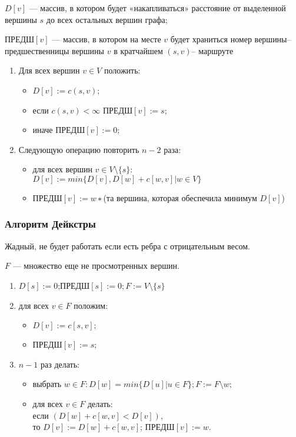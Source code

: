 $D[v]$ — массив, в котором будет «накапливаться» расстояние от выделенной вершины $s$ до всех остальных вершин графа;

 ПРЕДШ$[v]$ — массив, в котором на месте $v$ будет храниться номер вершины–предшественницы вершины $v$ в кратчайшем $(s,v)$– маршруте
 
\begin{enumerate}
	\item Для всех вершин $v \in V$ положить: \begin{itemize}
		\item $D[v] := c(s, v)$;
		\item если $ c(s,v) < \infty$ ПРЕДШ$[v] := s$;
		\item иначе ПРЕДШ$[v] := 0$;
	\end{itemize}
	\item Следующую операцию повторить $n − 2$ раза: \begin{itemize}
		\item для всех вершин $v \in V \setminus \{s\}$:\\ $D[v]:=min\{D[v],D[w]+c[w,v]|w \in V\}$
		\item ПРЕДШ$[v] := w∗$(та вершина, которая обеспечила минимум $D[v]$)
	\end{itemize}
\end{enumerate}

\subsubsection{Алгоритм Дейкстры}
Жадный, не будет работать если есть ребра с отрицательным весом.

$F$ — множество еще не просмотренных вершин.

\begin{enumerate}
	\item $D[s] := 0$;ПРЕДШ$[s] := 0;F := V\setminus\{s\}$
	\item для всех $v \in F$ положим: \begin{itemize}
		\item $D[v] := c[s, v];$
		\item ПРЕДШ$[v] := s;$
	\end{itemize}
	\item $n−1$ раз делать: \begin{itemize}
		\item выбрать $w \in  F : D[w] = min\{D[u]|u \in F\};F := F\setminus{w};$
		\item для всех $v \in F$ делать: \\ если $(D [w ] + c [w , v ] < D [v ])$,\\ то $D [v ] := D [w ] + c [w , v ]$; ПРЕДШ$[v] := w$.
		
	\end{itemize}
\end{enumerate}

